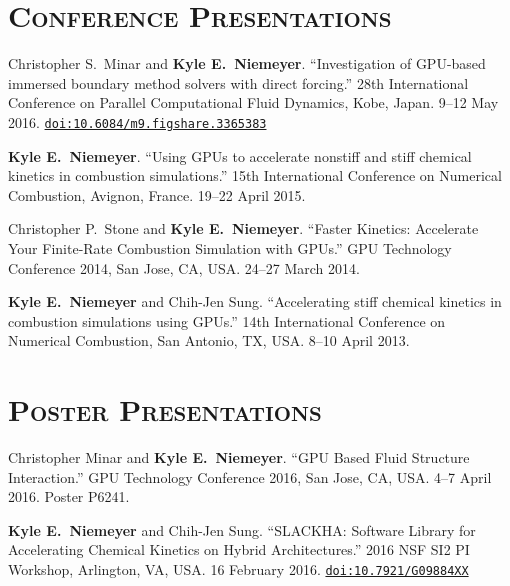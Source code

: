 \documentclass[margin,line,11pt]{res}
\makeatletter
\newlength{\bibhang}
\newlength{\bibsep}
 {\@listi \global\bibsep\itemsep \global\advance\bibsep by\parsep}
\newenvironment{bibenum*}
  {\renewcommand\labelenumi{\theenumi.}%
   \etaremune[
     topsep=0pt,
     itemsep=\bibsep,
     parsep=0pt,partopsep=0pt,
     itemindent=-\bibhang,
     leftmargin={\bibhang+\widthof{[999]}}]}
  {\endetaremune}
\newcommand*{\doi}[1]{\href{http://dx.doi.org/#1}{\nolinkurl{doi:#1}}}
\makeatother
\begin{document}
\begin{resume}
\section{\textsc{Conference Presentations}}

\begin{bibenum*}

\item Christopher S.\ Minar and \textbf{Kyle E.\ Niemeyer}. ``Investigation of GPU-based immersed boundary method solvers with direct forcing.''
28th International Conference on Parallel Computational Fluid Dynamics, Kobe, Japan.
9--12 May 2016.
\doi{10.6084/m9.figshare.3365383}

\item \textbf{Kyle E.\ Niemeyer}.
``Using GPUs to accelerate nonstiff and stiff chemical kinetics in combustion simulations.''
15th International Conference on Numerical Combustion, Avignon, France.
19--22 April 2015.

\item Christopher P.\ Stone and \textbf{Kyle E.\ Niemeyer}.
``Faster Kinetics: Accelerate Your Finite-Rate Combustion Simulation with GPUs.''
GPU Technology Conference 2014, San Jose, CA, USA.
24--27 March 2014.

\item \textbf{Kyle E.\ Niemeyer} and Chih-Jen Sung.
``Accelerating stiff chemical kinetics in combustion simulations using GPUs.''
14th International Conference on Numerical Combustion, San Antonio, TX, USA.
8--10 April 2013.

\end{bibenum*}

\section{\textsc{Poster Presentations}}

\begin{bibenum*}

\item Christopher Minar and \textbf{Kyle E.\ Niemeyer}.
``GPU Based Fluid Structure Interaction.''
GPU Technology Conference 2016, San Jose, CA, USA.
4--7 April 2016.
Poster P6241.

\item \textbf{Kyle E.\ Niemeyer} and Chih-Jen Sung.
``SLACKHA: Software Library for Accelerating Chemical Kinetics on Hybrid Architectures.'' 2016 NSF SI2 PI Workshop, Arlington, VA, USA.
16 February 2016.
\doi{10.7921/G09884XX}


\end{bibenum*}
\end{resume}
\end{document}
